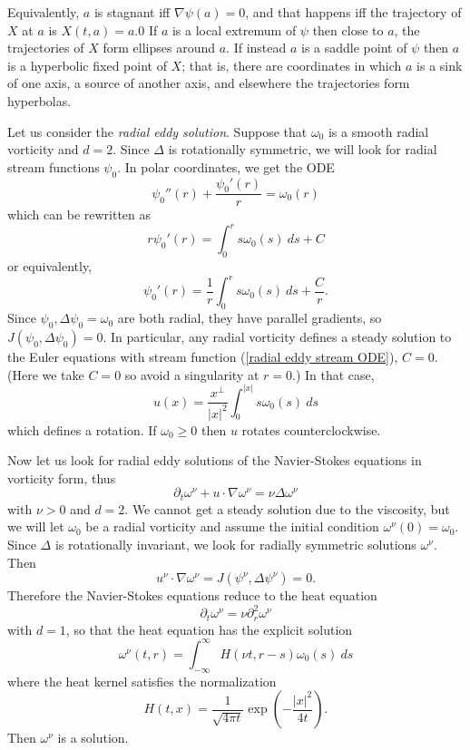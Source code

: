 \documentclass[12pt]{book}
\newcommand{\dfn}[1]{\emph{#1}\index{#1}}
\theoremstyle{definition}
\newenvironment{example}
  {\pushQED{\qed}\renewcommand{\qedsymbol}{$\diamondsuit$}\examplex}
  {\popQED\endexamplex}
\begin{document}
Equivalently, $a$ is stagnant iff $\nabla \psi(a) = 0$, and that happens iff the trajectory of $X$ at $a$ is $X(t, a) = a$.0
If $a$ is a local extremum of $\psi$ then close to $a$, the trajectories of $X$ form ellipses around $a$.
If instead $a$ is a saddle point of $\psi$ then $a$ is a hyperbolic fixed point of $X$; that is, there are coordinates in which $a$ is a sink of one axis, a source of another axis, and elsewhere the trajectories form hyperbolas.

\begin{example}
Let us consider the \dfn{radial eddy solution}.
Suppose that $\omega_0$ is a smooth radial vorticity and $d = 2$.
Since $\Delta$ is rotationally symmetric, we will look for radial stream functions $\psi_0$.
In polar coordinates, we get the ODE
$$\psi_0''(r) + \frac{\psi_0'(r)}{r} = \omega_0(r)$$
which can be rewritten as
$$r \psi_0'(r) = \int_0^r s\omega_0(s) ~ds + C$$
or equivalently,
\begin{equation}
\label{radial eddy stream ODE}
\psi_0'(r) = \frac{1}{r} \int_0^r s\omega_0(s) ~ds + \frac{C}{r}.
\end{equation}
Since $\psi_0, \Delta \psi_0 = \omega_0$ are both radial, they have parallel gradients, so $J(\psi_0, \Delta \psi_0) = 0$.
In particular, any radial vorticity defines a steady solution to the Euler equations with stream function (\ref{radial eddy stream ODE}), $C = 0$.
(Here we take $C = 0$ so avoid a singularity at $r = 0$.)
In that case,
$$u(x) = \frac{x^\perp}{|x|^2} \int_0^{|x|} s\omega_0(s) ~ds$$
which defines a rotation.
If $\omega_0 \geq 0$ then $u$ rotates counterclockwise.
\end{example}

\begin{example}
Now let us look for radial eddy solutions of the Navier-Stokes equations in vorticity form, thus
$$\partial_t \omega^\nu + u \cdot \nabla \omega^\nu = \nu \Delta \omega^\nu$$
with $\nu > 0$ and $d = 2$.
We cannot get a steady solution due to the viscosity, but we will let $\omega_0$ be a radial vorticity and assume the initial condition $\omega^\nu(0) = \omega_0$.
Since $\Delta$ is rotationally invariant, we look for radially symmetric solutions $\omega^\nu$.
Then
$$u^\nu \cdot \nabla \omega^\nu = J(\psi^\nu, \Delta \psi^\nu) = 0.$$
Therefore the Navier-Stokes equations reduce to the heat equation
$$\partial_t \omega^\nu = \nu \partial_r^2 \omega^\nu$$
with $d = 1$, so that the heat equation has the explicit solution
$$\omega^\nu(t, r) = \int_{-\infty}^\infty H(\nu t, r - s) \omega_0(s) ~ds$$
where the heat kernel satisfies the normalization
$$H(t, x) = \frac{1}{\sqrt{4\pi t}} \exp\left(-\frac{|x|^2}{4t}\right).$$
Then $\omega^\nu$ is a solution.
\end{example}
\end{document}
